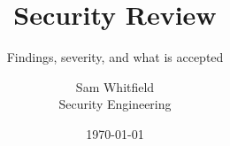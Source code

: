 \documentclass[aspectratio=169,11pt]{beamer}
\title{Security Review}
\subtitle{Findings, severity, and what is accepted}
\author{Sam Whitfield \\ \small Security Engineering}
\date{\today}
\begin{document}
\titleslide





\end{document}
